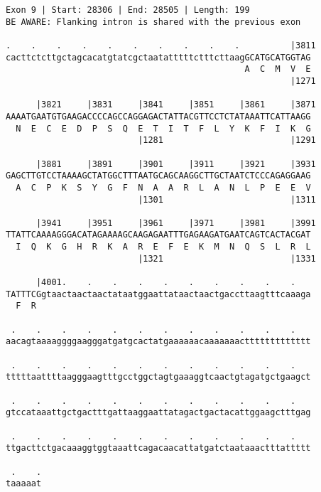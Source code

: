 \documentclass{article}
\begin{document}
\begin{Verbatim}
Exon 9 | Start: 28306 | End: 28505 | Length: 199
BE AWARE: Flanking intron is shared with the previous exon
 
.    .    .    .    .    .    .    .    .    .          |3811
cacttctcttgctagcacatgtatcgctaatatttttctttcttaagGCATGCATGGTAG
                                               A  C  M  V  E
                                                        |1271
  
      |3821     |3831     |3841     |3851     |3861     |3871
AAAATGAATGTGAAGACCCCAGCCAGGAGACTATTACGTTCCTCTATAAATTCATTAAGG
  N  E  C  E  D  P  S  Q  E  T  I  T  F  L  Y  K  F  I  K  G
                          |1281                         |1291
  
      |3881     |3891     |3901     |3911     |3921     |3931
GAGCTTGTCCTAAAAGCTATGGCTTTAATGCAGCAAGGCTTGCTAATCTCCCAGAGGAAG
  A  C  P  K  S  Y  G  F  N  A  A  R  L  A  N  L  P  E  E  V
                          |1301                         |1311
  
      |3941     |3951     |3961     |3971     |3981     |3991
TTATTCAAAAGGGACATAGAAAAGCAAGAGAATTTGAGAAGATGAATCAGTCACTACGAT
  I  Q  K  G  H  R  K  A  R  E  F  E  K  M  N  Q  S  L  R  L
                          |1321                         |1331
  
      |4001.    .    .    .    .    .    .    .    .    .   
TATTTCGgtaactaactaactataatggaattataactaactgaccttaagtttcaaaga
  F  R                                                      
  
 .    .    .    .    .    .    .    .    .    .    .    .   
aacagtaaaaggggaagggatgatgcactatgaaaaaacaaaaaaacttttttttttttt
  
 .    .    .    .    .    .    .    .    .    .    .    .   
tttttaattttaagggaagtttgcctggctagtgaaaggtcaactgtagatgctgaagct
  
 .    .    .    .    .    .    .    .    .    .    .    .   
gtccataaattgctgactttgattaaggaattatagactgactacattggaagctttgag
  
 .    .    .    .    .    .    .    .    .    .    .    .   
ttgacttctgacaaaggtggtaaattcagacaacattatgatctaataaactttattttt
  
 .    .
taaaaat
\end{Verbatim}
\newpage
\end{document}

